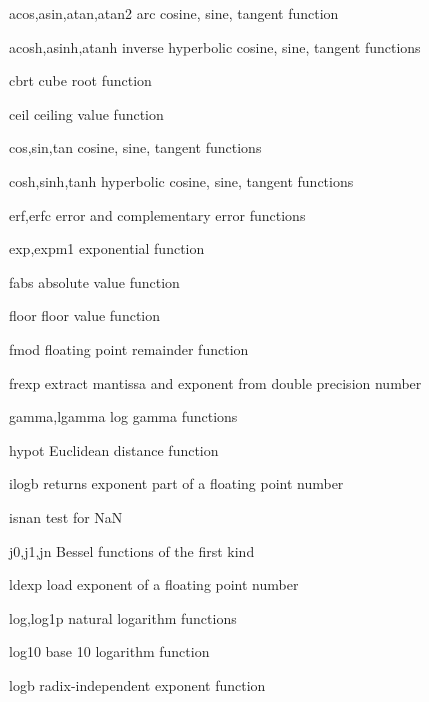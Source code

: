 %
%
\begin{csymlist}
\item[acos,asin,atan,atan2]
	   
	arc cosine, sine, tangent function
\item[acosh,asinh,atanh]
	  
	inverse hyperbolic cosine, sine, tangent functions
\item[cbrt]
	cube root function
\item[ceil]
	ceiling value function
\item[cos,sin,tan]
	  
	cosine, sine, tangent functions
\item[cosh,sinh,tanh]
	  
	hyperbolic cosine, sine, tangent functions
\item[erf,erfc]
	 
	error and complementary error functions
\item[exp,expm1]
	 
	exponential function
\item[fabs]
	absolute value function
\item[floor]
	floor value function
\item[fmod]
	floating point remainder function
\item[frexp]
	extract mantissa and exponent from double precision number
\item[gamma,lgamma]
	 
	log gamma functions
\item[hypot]
	Euclidean distance function
\item[ilogb]
	returns exponent part of a floating point number
\item[isnan]
	test for NaN
\item[j0,j1,jn]
	  
	Bessel functions of the first kind
\item[ldexp]
	load exponent of a floating point number
\item[log,log1p]
	 
	natural logarithm functions
\item[log10]
	base 10 logarithm function
\item[logb]
	radix-independent exponent function

\end{csymlist}
